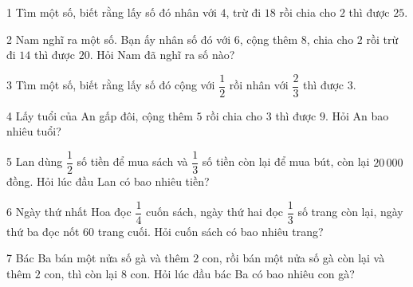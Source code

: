 \begin{probbox}{1}{\relax}
Tìm một số, biết rằng lấy số đó nhân với $4$, trừ đi $18$ rồi chia cho $2$ thì được $25$.
\end{probbox}
\gap
\begin{probbox}{2}{\relax}
Nam nghĩ ra một số. Bạn ấy nhân số đó với $6$, cộng thêm $8$, chia cho $2$ rồi trừ đi $14$ thì được $20$. Hỏi Nam đã nghĩ ra số nào?
\end{probbox}
\gap
\begin{probbox}{3}{\relax}
Tìm một số, biết rằng lấy số đó cộng với $\dfrac12$ rồi nhân với $\dfrac23$ thì được $3$.
\end{probbox}
\gap
\begin{probbox}{4}{\relax}
Lấy tuổi của An gấp đôi, cộng thêm $5$ rồi chia cho $3$ thì được $9$. Hỏi An bao nhiêu tuổi?
\end{probbox}
\gap
\begin{probbox}{5}{\relax}
Lan dùng $\dfrac12$ số tiền để mua sách và $\dfrac13$ số tiền còn lại để mua bút, còn lại $20\,000$ đồng. Hỏi lúc đầu Lan có bao nhiêu tiền?
\end{probbox}
\gap
\begin{probbox}{6}{\relax}
Ngày thứ nhất Hoa đọc $\dfrac14$ cuốn sách, ngày thứ hai đọc $\dfrac13$ số trang còn lại, ngày thứ ba đọc nốt $60$ trang cuối. Hỏi cuốn sách có bao nhiêu trang?
\end{probbox}
\gap
\begin{probbox}{7}{\relax}
Bác Ba bán một nửa số gà và thêm $2$ con, rồi bán một nửa số gà còn lại và thêm $2$ con, thì còn lại $8$ con. Hỏi lúc đầu bác Ba có bao nhiêu con gà?
\end{probbox}
